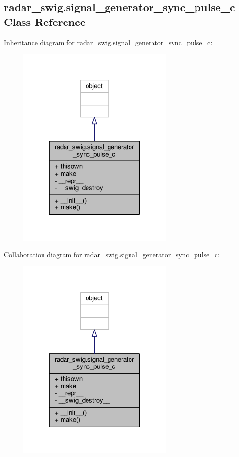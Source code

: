 \subsection{radar\+\_\+swig.\+signal\+\_\+generator\+\_\+sync\+\_\+pulse\+\_\+c Class Reference}
\label{classradar__swig_1_1signal__generator__sync__pulse__c}


Inheritance diagram for radar\+\_\+swig.\+signal\+\_\+generator\+\_\+sync\+\_\+pulse\+\_\+c\+:
\nopagebreak
\begin{figure}[H]
\begin{center}
\leavevmode
\includegraphics[width=218pt]{dd/d7d/classradar__swig_1_1signal__generator__sync__pulse__c__inherit__graph}
\end{center}
\end{figure}


Collaboration diagram for radar\+\_\+swig.\+signal\+\_\+generator\+\_\+sync\+\_\+pulse\+\_\+c\+:
\nopagebreak
\begin{figure}[H]
\begin{center}
\leavevmode
\includegraphics[width=218pt]{d9/da1/classradar__swig_1_1signal__generator__sync__pulse__c__coll__graph}
\end{center}
\end{figure}
